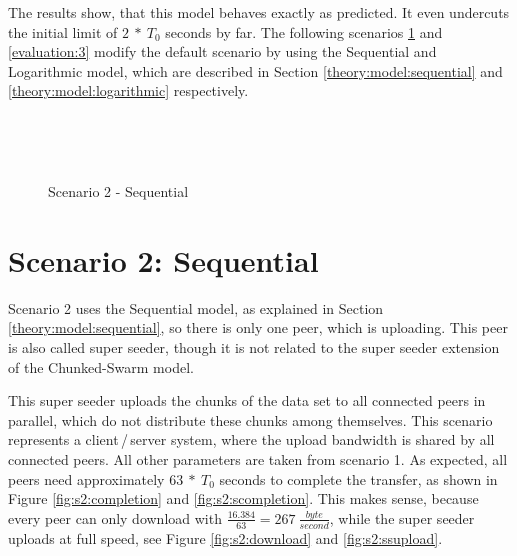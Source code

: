 The results show, that this model behaves exactly as predicted. It even undercuts the initial limit of $2\:*\:T_0$ seconds by far. The following scenarios \ref{evaluation:2} and \ref{evaluation:3} modify the default scenario by using the Sequential and Logarithmic model, which are described in Section \ref{theory:model:sequential} and \ref{theory:model:logarithmic} respectively.


\vfill
\pagebreak

\begin{figure}[ht]
	\begin{center}
		~ %

		~ %

		\caption{Scenario 2 - Sequential}
		\label{fig:s2}
	\end{center}
\end{figure}

\pagebreak
\section{Scenario 2: Sequential}
\label{evaluation:2}

Scenario 2 uses the Sequential model, as explained in Section \ref{theory:model:sequential}, so there is only one peer, which is uploading. This peer is also called super seeder, though it is not related to the super seeder extension of the Chunked-Swarm model. 

This super seeder uploads the chunks of the data set to all connected peers in parallel, which do not distribute these chunks among themselves. This scenario represents a client\,/\,server system, where the upload bandwidth is shared by all connected peers. All other parameters are taken from scenario 1. As expected, all peers need approximately $63\:*\:T_0$ seconds to complete the transfer, as shown in Figure \ref{fig:s2:completion} and \ref{fig:s2:scompletion}. This makes sense, because every peer can only download with $\frac{16.384}{63}=267\:\frac{byte}{second}$, while the super seeder uploads at full speed, see Figure \ref{fig:s2:download} and \ref{fig:s2:ssupload}.

